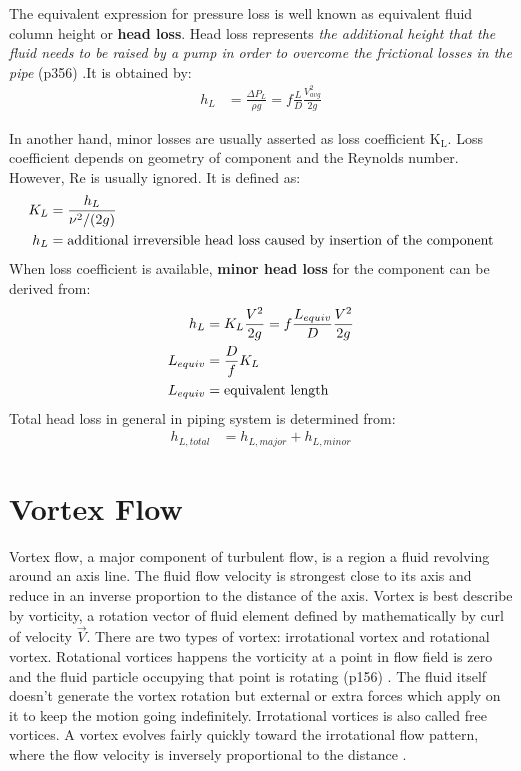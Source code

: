 The equivalent expression for pressure loss is well known as equivalent fluid column height or \textbf{head loss}. Head loss represents \textit{the additional height that the fluid needs to be raised by a pump in order to overcome the frictional losses in the pipe} (p356) \cite{cengel:book}.It is obtained by:
\begin{align}
 h_L & =  \frac{\Delta P_L}{\rho g} = f \frac{L}{D} \frac{V_{avg}^2 }{2g}
\end{align}

In another hand, minor losses are usually asserted as loss coefficient K$_{\text{L}}$.  Loss coefficient depends on geometry of component and the Reynolds number. However, Re is usually ignored. It is defined as:
\begin{align}
K_L & =  \frac{h_L}{\nu^2 / (2g)}  \\
h_L  & = \textnormal{additional irreversible head loss caused by insertion of the component}
\end{align}
When loss coefficient is available, \textbf{minor head loss} for the component can be derived from:
\begin{align}
 h_L & =  K_L \frac{V^2}{2g} = f \frac{L_{equiv}}{D} \frac{V^2 }{2g} \\
 L_{equiv} &= \frac{D}{f} K_L \\
 L_{equiv} &= \textnormal{equivalent length}
\end{align}
Total head loss in general in piping system is determined from:
\begin{align}
 h_{L, total} & = h_{L, major} + h_{L, minor}
\end{align}
\section{Vortex Flow}
Vortex flow, a major component of turbulent flow, is a region a fluid revolving around an axis line. The fluid flow velocity is strongest close to its axis and reduce in an inverse proportion to the distance of the axis. 
Vortex is best describe by vorticity, a rotation vector of fluid element defined by mathematically by curl of velocity $\vec{V}$. 
There are two types of vortex: irrotational vortex and rotational vortex. Rotational vortices happens the vorticity at a point in flow field is zero and the fluid particle occupying that point is rotating (p156)\cite{cengel:book} . The fluid itself doesn't generate the vortex rotation but external or extra forces which apply on it to keep the motion going indefinitely. 
Irrotational vortices is also called free vortices. A vortex evolves fairly quickly toward the irrotational flow pattern, where the flow velocity is inversely proportional to the distance \cite{wiki:web}.

